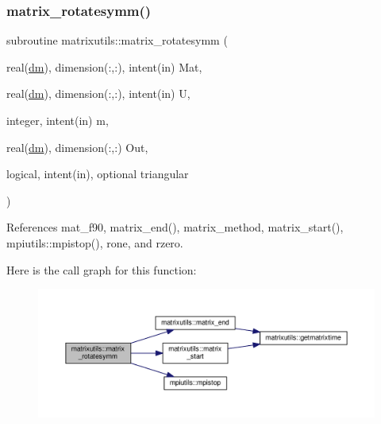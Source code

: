 \subsubsection{\texorpdfstring{matrix\+\_\+rotatesymm()}{matrix\_rotatesymm()}}
{\footnotesize\ttfamily subroutine matrixutils\+::matrix\+\_\+rotatesymm (\begin{DoxyParamCaption}\item[{real(\mbox{\hyperlink{namespacematrixutils_a7bdc564986ea4d90f51201c75606ef3d}{dm}}), dimension(\+:,\+:), intent(in)}]{Mat,  }\item[{real(\mbox{\hyperlink{namespacematrixutils_a7bdc564986ea4d90f51201c75606ef3d}{dm}}), dimension(\+:,\+:), intent(in)}]{U,  }\item[{integer, intent(in)}]{m,  }\item[{real(\mbox{\hyperlink{namespacematrixutils_a7bdc564986ea4d90f51201c75606ef3d}{dm}}), dimension(\+:,\+:)}]{Out,  }\item[{logical, intent(in), optional}]{triangular }\end{DoxyParamCaption})}



References mat\+\_\+f90, matrix\+\_\+end(), matrix\+\_\+method, matrix\+\_\+start(), mpiutils\+::mpistop(), rone, and rzero.

Here is the call graph for this function\+:
\nopagebreak
\begin{figure}[H]
\begin{center}
\leavevmode
\includegraphics[width=350pt]{namespacematrixutils_aec8c0f5500ce3fccc5a427276bbc95d2_cgraph}
\end{center}
\end{figure}
\mbox{\label{namespacematrixutils_a2662807273dfd077b6501df4d09909d9}} 
